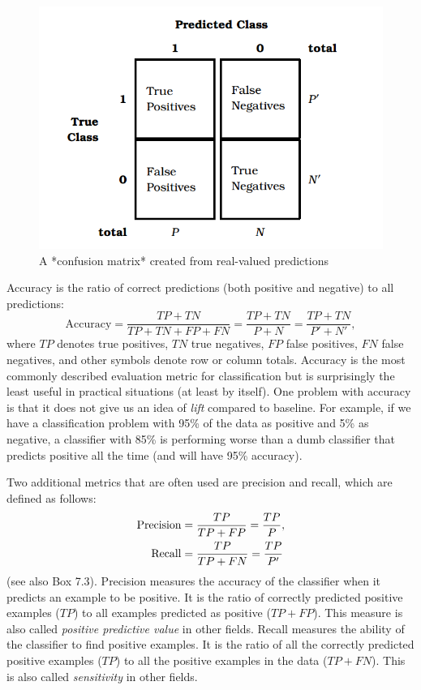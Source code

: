 \documentclass[]{krantz}
\begin{document}
\begin{figure}

{\centering \includegraphics[width=0.7\linewidth]{ChapterML/figures/cm} 

}

\caption{A *confusion matrix* created from real-valued predictions}\label{fig:cm}
\end{figure}

Accuracy is the ratio of correct predictions (both positive and
negative) to all predictions:
\[\textrm{Accuracy}=\frac{TP + TN}{TP + TN + FP + FN}=\frac{TP + TN}{P+N}=\frac{TP + TN}{P'+N'},\]
where \(TP\) denotes true positives, \(TN\) true negatives, \(FP\) false
positives, \(FN\) false negatives, and other symbols denote row or
column totals. Accuracy is the most commonly described evaluation metric
for classification but is surprisingly the least useful in practical
situations (at least by itself). One problem with accuracy is that it
does not give us an idea of \emph{lift} compared to baseline. For
example, if we have a classification problem with 95\% of the data as
positive and 5\% as negative, a classifier with 85\% is performing worse
than a dumb classifier that predicts positive all the time (and will
have 95\% accuracy).

Two additional metrics that are often used are precision and recall,
which are defined as follows: \[\begin{aligned}
{\rm Precision} &= \frac{TP}{TP + FP}=\frac{TP}{P},
\\
{\rm Recall} &= \frac{TP}{TP + FN}=\frac{TP}{P'}\end{aligned}\] (see
also Box 7.3). Precision measures the accuracy of the classifier when it
predicts an example to be positive. It is the ratio of correctly
predicted positive examples (\(TP\)) to all examples predicted as
positive (\(TP + FP\)). This measure is also called \emph{positive
predictive value} in other fields. Recall measures the ability of the
classifier to find positive examples. It is the ratio of all the
correctly predicted positive examples (\(TP\)) to all the positive
examples in the data (\(TP + FN\)). This is also called
\emph{sensitivity} in other fields.
\end{document}
